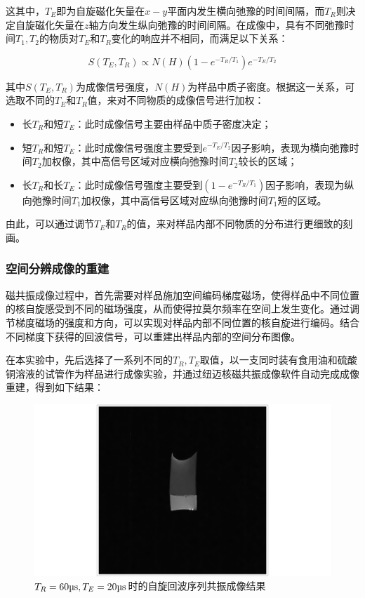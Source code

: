 \documentclass{thuemp}
\begin{document}
这其中，$T_E$即为自旋磁化矢量在$x-y$平面内发生横向弛豫的时间间隔，而$T_R$则决定自旋磁化矢量在$z$轴方向发生纵向弛豫的时间间隔。在成像中，具有不同弛豫时间$T_1,T_2$的物质对$T_E$和$T_R$变化的响应并不相同，而满足以下关系：

\begin{equation}
    S(T_E, T_R) \propto N(H) \left(1 - e^{-T_R/T_1}\right)e^{-T_E/T_2}
\end{equation}

其中$S(T_E, T_R)$为成像信号强度，$N(H)$为样品中质子密度。根据这一关系，可选取不同的$T_E$和$T_R$值，来对不同物质的成像信号进行加权：

\begin{itemize}
    \item 长$T_R$和短$T_E$：此时成像信号主要由样品中质子密度决定；
    \item 短$T_R$和短$T_E$：此时成像信号强度主要受到$e^{-T_E/T_2}$因子影响，表现为横向弛豫时间$T_2$加权像，其中高信号区域对应横向弛豫时间$T_2$较长的区域；
    \item 长$T_R$和长$T_E$：此时成像信号强度主要受到$(1-e^{-T_R/T_1})$因子影响，表现为纵向弛豫时间$T_1$加权像，其中高信号区域对应纵向弛豫时间$T_1$短的区域。
\end{itemize}

由此，可以通过调节$T_E$和$T_R$的值，来对样品内部不同物质的分布进行更细致的刻画。

\subsubsection{空间分辨成像的重建}

磁共振成像过程中，首先需要对样品施加空间编码梯度磁场，使得样品中不同位置的核自旋感受到不同的磁场强度，从而使得拉莫尔频率在空间上发生变化。通过调节梯度磁场的强度和方向，可以实现对样品内部不同位置的核自旋进行编码。结合不同梯度下获得的回波信号，可以重建出样品内部的空间分布图像。

在本实验中，先后选择了一系列不同的$T_R, T_E$取值，以一支同时装有食用油和硫酸铜溶液的试管作为样品进行成像实验，并通过纽迈核磁共振成像软件自动完成成像重建，得到如下结果：

\begin{figure}[H]
    \centering
    \includegraphics[width=0.8\linewidth]{../Data/pre-experiment/MRI_result_TR_0060_TE_020.png}
    \caption{$T_R = \text{\si{60 \micro\second}}, T_E = \text{\si{20 \micro\second}}$时的自旋回波序列共振成像结果}
    \label{fig:mri_0060_020}
\end{figure}
\end{document}
